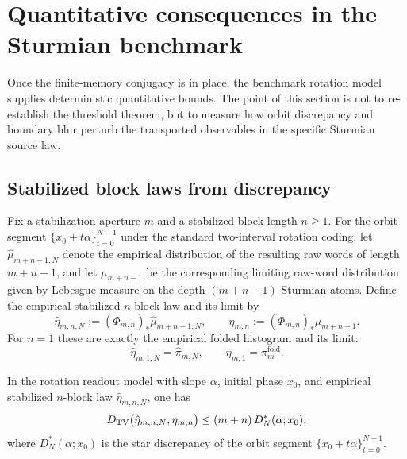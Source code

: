 \section{Quantitative consequences in the Sturmian benchmark}\label{sec:fp:tv}

Once the finite-memory conjugacy is in place, the benchmark rotation model supplies deterministic quantitative bounds. The point of this section is not to re-establish the threshold theorem, but to measure how orbit discrepancy and boundary blur perturb the transported observables in the specific Sturmian source law.

\subsection{Stabilized block laws from discrepancy}

Fix a stabilization aperture $m$ and a stabilized block length $n\ge 1$. For the orbit segment $\{x_0+t\alpha\}_{t=0}^{N-1}$ under the standard two-interval rotation coding, let $\hat{\mu}_{m+n-1,N}$ denote the empirical distribution of the resulting raw words of length $m+n-1$, and let $\mu_{m+n-1}$ be the corresponding limiting raw-word distribution given by Lebesgue measure on the depth-$(m+n-1)$ Sturmian atoms. Define the empirical stabilized $n$-block law and its limit by
\[
\hat{\eta}_{m,n,N}:=(\Phi_{m,n})_*\hat{\mu}_{m+n-1,N},
\qquad
\eta_{m,n}:=(\Phi_{m,n})_*\mu_{m+n-1}.
\]
For $n=1$ these are exactly the empirical folded histogram and its limit:
\[
\hat{\eta}_{m,1,N}=\hat{\pi}_{m,N},
\qquad
\eta_{m,1}=\pi_m^{\mathrm{fold}}.
\]

\begin{theorem}\label{thm:tv-certificate}
In the rotation readout model with slope $\alpha$, initial phase $x_0$, and empirical stabilized $n$-block law $\hat{\eta}_{m,n,N}$, one has
\begin{equation}\label{eq:tv-certificate}
D_{\mathrm{TV}}\bigl(\hat{\eta}_{m,n,N},\eta_{m,n}\bigr)\le(m+n)\,D_N^*(\alpha;x_0),
\end{equation}
where $D_N^*(\alpha;x_0)$ is the star discrepancy of the orbit segment $\{x_0+t\alpha\}_{t=0}^{N-1}$.
\end{theorem}

